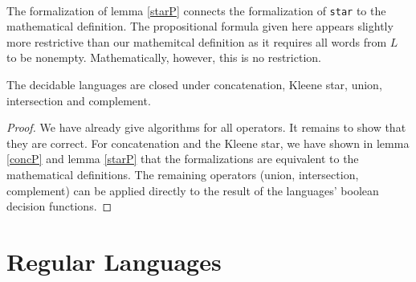     \paragraph{}
    The formalization of lemma \ref{starP} connects the formalization of \lstinline{star} to the mathematical definition. The propositional formula given here appears slightly more restrictive than our mathemitcal definition as it requires all words from $L$ to be nonempty. 
    Mathematically, however, this is no restriction. 
    


    \begin{theorem}{}
        \label{DecLangClosed}
        The decidable languages are closed under concatenation, Kleene star, union, intersection and complement. 
    \end{theorem}
    \begin{proof}
        We have already give algorithms for all operators. 
        It remains to show that they are correct.
        For concatenation and the Kleene star, we have shown in lemma \ref{concP} and lemma \ref{starP} that the formalizations are equivalent to the mathematical definitions. 
        The remaining operators (union, intersection, complement) can be applied directly to the result of the languages' boolean decision functions.
    \end{proof}

    \paragraph{}


    \section{Regular Languages}


